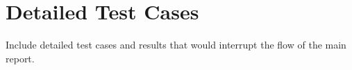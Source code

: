 \chapter{Detailed Test Cases}
Include detailed test cases and results that would interrupt the flow of the main report.
